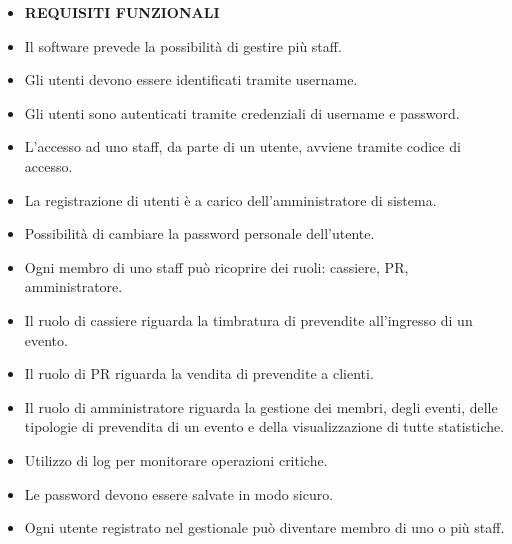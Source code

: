 \documentclass[a4paper]{article}
\begin{document}
\begin{itemize}
	
	\item \textbf{REQUISITI FUNZIONALI}
		
	\item Il software prevede la possibilità di gestire più staff.
	
	
	\item Gli utenti devono essere identificati tramite username.
	
	\item Gli utenti sono autenticati tramite credenziali di username e password.
	\item L'accesso ad uno staff, da parte di un utente, avviene tramite codice di accesso.	

	\item La registrazione di utenti è a carico dell'amministratore di sistema.
	\item Possibilità di cambiare la password personale dell'utente.
		
	\item Ogni membro di uno staff può ricoprire dei ruoli: cassiere, PR, amministratore.	
	\item Il ruolo di cassiere riguarda la timbratura di prevendite all'ingresso di un evento.
	\item Il ruolo di PR riguarda la vendita di prevendite a clienti.
	\item Il ruolo di amministratore riguarda la gestione dei membri, degli eventi, delle tipologie di prevendita di un evento e della visualizzazione di tutte statistiche.
	
	\item Utilizzo di log per monitorare operazioni critiche.

	\item Le password devono essere salvate in modo sicuro.
	
	
	
	\item Ogni utente registrato nel gestionale può diventare membro di uno o più staff. 
	

\end{itemize}
\end{document}
